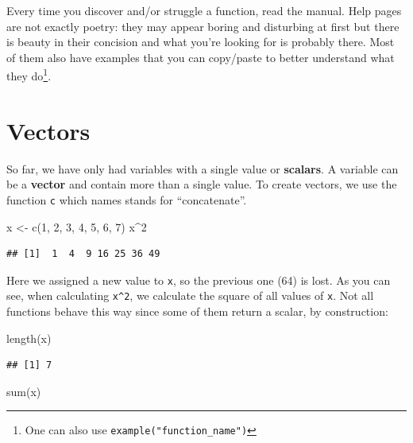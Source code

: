 \documentclass[
]{book}
\newenvironment{Shaded}{\begin{snugshade}}{\end{snugshade}}
\newcommand{\DecValTok}[1]{\textcolor[rgb]{0.00,0.00,0.81}{#1}}
\newcommand{\FunctionTok}[1]{\textcolor[rgb]{0.00,0.00,0.00}{#1}}
\newcommand{\NormalTok}[1]{#1}
\newcommand{\OtherTok}[1]{\textcolor[rgb]{0.56,0.35,0.01}{#1}}
\newcommand{\SpecialCharTok}[1]{\textcolor[rgb]{0.00,0.00,0.00}{#1}}
\begin{document}
Every time you discover and/or struggle a function, read the manual. Help pages are not exactly poetry: they may appear boring and disturbing at first but there is beauty in their concision and what you're looking for is probably there. Most of them also have examples that you can copy/paste to better understand what they do\footnote{One can also use \texttt{example("function\_name")}}.

\hypertarget{vectors}{%
\section{Vectors}\label{vectors}}

So far, we have only had variables with a single value or \textbf{scalars}. A variable can be a \textbf{vector} and contain more than a single value. To create vectors, we use the function \texttt{c} which names stands for ``concatenate''.

\begin{Shaded}
\begin{Highlighting}[]
\NormalTok{x }\OtherTok{\textless{}{-}} \FunctionTok{c}\NormalTok{(}\DecValTok{1}\NormalTok{, }\DecValTok{2}\NormalTok{, }\DecValTok{3}\NormalTok{, }\DecValTok{4}\NormalTok{, }\DecValTok{5}\NormalTok{, }\DecValTok{6}\NormalTok{, }\DecValTok{7}\NormalTok{)}
\NormalTok{x}\SpecialCharTok{\^{}}\DecValTok{2}
\end{Highlighting}
\end{Shaded}

\begin{verbatim}
## [1]  1  4  9 16 25 36 49
\end{verbatim}

Here we assigned a new value to \texttt{x}, so the previous one (64) is lost. As you can see, when calculating \texttt{x\^{}2}, we calculate the square of all values of \texttt{x}. Not all functions behave this way since some of them return a scalar, by construction:

\begin{Shaded}
\begin{Highlighting}[]
\FunctionTok{length}\NormalTok{(x)}
\end{Highlighting}
\end{Shaded}

\begin{verbatim}
## [1] 7
\end{verbatim}

\begin{Shaded}
\begin{Highlighting}[]
\FunctionTok{sum}\NormalTok{(x)}
\end{Highlighting}
\end{Shaded}
\end{document}
